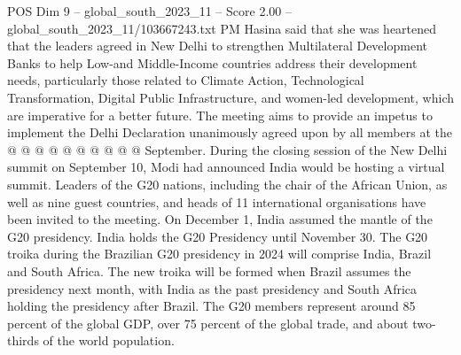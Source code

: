 \begin{textsample}{POS Dim 9 – global\_south\_2023\_11 – Score 2.00 – global\_south\_2023\_11/103667243.txt}
PM Hasina said that she was heartened that the leaders agreed in New Delhi to strengthen Multilateral Development Banks to help Low-and Middle-Income countries address their development needs, particularly those related to Climate Action, Technological Transformation, Digital Public Infrastructure, and women-led development, which are imperative for a better future.
The meeting aims to provide an impetus to implement the Delhi Declaration unanimously agreed upon by all members at the @ @ @ @ @ @ @ @ @ @ September.
During the closing session of the New Delhi summit on September 10, Modi had announced India would be hosting a virtual summit.
Leaders of the G20 nations, including the chair of the African Union, as well as nine guest countries, and heads of 11 international organisations have been invited to the meeting.
On December 1, India assumed the mantle of the G20 presidency.
India holds the G20 Presidency until November 30.
The G20 troika during the Brazilian G20 presidency in 2024 will comprise India, Brazil and South Africa.
The new troika will be formed when Brazil assumes the presidency next month, with India as the past presidency and South Africa holding the presidency after Brazil.
The G20 members represent around 85 percent of the global GDP, over 75 percent of the global trade, and about two-thirds of the world population.

\end{textsample}
